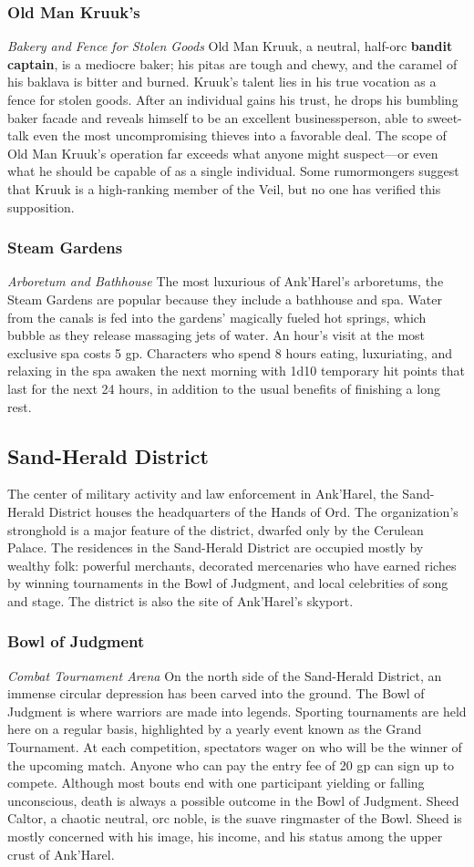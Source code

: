 \documentclass[10pt,a4,twoside,twocolumn,openany,nodeprecatedcode]{dndbook}
\begin{document}
\subsubsection{Old Man Kruuk's}
\textit{Bakery and Fence for Stolen Goods}
Old Man Kruuk, a neutral, half-orc \textbf{bandit captain}, is a mediocre baker; his pitas are tough and chewy, and the caramel of his baklava is bitter and burned. Kruuk's talent lies in his true vocation as a fence for stolen goods. After an individual gains his trust, he drops his bumbling baker facade and reveals himself to be an excellent businessperson, able to sweet-talk even the most uncompromising thieves into a favorable deal.
The scope of Old Man Kruuk's operation far exceeds what anyone might suspect—or even what he should be capable of as a single individual. Some rumormongers suggest that Kruuk is a high-ranking member of the Veil, but no one has verified this supposition.
\subsubsection{Steam Gardens}
\textit{Arboretum and Bathhouse}
The most luxurious of Ank'Harel's arboretums, the Steam Gardens are popular because they include a bathhouse and spa. Water from the canals is fed into the gardens' magically fueled hot springs, which bubble as they release massaging jets of water.
An hour's visit at the most exclusive spa costs 5 gp. Characters who spend 8 hours eating, luxuriating, and relaxing in the spa awaken the next morning with 1d10 temporary hit points that last for the next 24 hours, in addition to the usual benefits of finishing a long rest.
\subsection{Sand-Herald District}
The center of military activity and law enforcement in Ank'Harel, the Sand-Herald District houses the headquarters of the Hands of Ord. The organization's stronghold is a major feature of the district, dwarfed only by the Cerulean Palace.
The residences in the Sand-Herald District are occupied mostly by wealthy folk: powerful merchants, decorated mercenaries who have earned riches by winning tournaments in the Bowl of Judgment, and local celebrities of song and stage. The district is also the site of Ank'Harel's skyport.
\subsubsection{Bowl of Judgment}
\textit{Combat Tournament Arena}
On the north side of the Sand-Herald District, an immense circular depression has been carved into the ground. The Bowl of Judgment is where warriors are made into legends. Sporting tournaments are held here on a regular basis, highlighted by a yearly event known as the Grand Tournament. At each competition, spectators wager on who will be the winner of the upcoming match. Anyone who can pay the entry fee of 20 gp can sign up to compete. Although most bouts end with one participant yielding or falling unconscious, death is always a possible outcome in the Bowl of Judgment.
Sheed Caltor, a chaotic neutral, orc noble, is the suave ringmaster of the Bowl. Sheed is mostly concerned with his image, his income, and his status among the upper crust of Ank'Harel.
\end{document}
